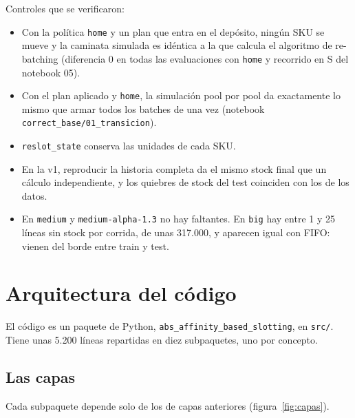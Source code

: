 \documentclass[11pt,a4paper,oneside]{report}
\newcommand{\code}[1]{\texttt{\small #1}}
\begin{document}
Controles que se verificaron:

\begin{itemize}
  \item Con la política \code{home} y un plan que entra en el depósito, ningún SKU se mueve y
        la caminata simulada es idéntica a la que calcula el algoritmo de re-batching
        (diferencia 0 en todas las evaluaciones con \code{home} y recorrido en S del notebook 05).
  \item Con el plan aplicado y \code{home}, la simulación pool por pool da exactamente lo mismo
        que armar todos los batches de una vez (notebook \code{correct\_base/01\_transicion}).
  \item \code{reslot\_state} conserva las unidades de cada SKU.
  \item En la v1, reproducir la historia completa da el mismo stock final que un cálculo
        independiente, y los quiebres de stock del test coinciden con los de los datos.
  \item En \code{medium} y \code{medium-alpha-1.3} no hay faltantes. En \code{big} hay entre 1
        y 25 líneas sin stock por corrida, de unas 317.000, y aparecen igual con FIFO: vienen
        del borde entre train y test.
\end{itemize}

\chapter{Arquitectura del código}
\label{cap:arquitectura}

El código es un paquete de Python, \code{abs\_affinity\_based\_slotting}, en
\code{src/}. Tiene unas 5.200 líneas repartidas en diez subpaquetes, uno por concepto.

\section{Las capas}

Cada subpaquete depende solo de los de capas anteriores (figura~\ref{fig:capas}).
\end{document}
